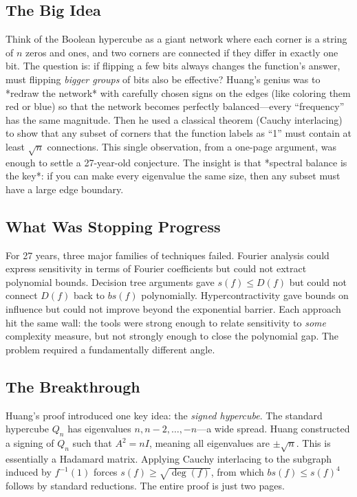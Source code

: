 \subsection{The Big Idea}
Think of the Boolean hypercube as a giant network where each corner is a string of $n$ zeros and ones, and two corners are connected if they differ in exactly one bit. The question is: if flipping a few bits always changes the function's answer, must flipping \emph{bigger groups} of bits also be effective? Huang's genius was to *redraw the network* with carefully chosen signs on the edges (like coloring them red or blue) so that the network becomes perfectly balanced---every ``frequency'' has the same magnitude. Then he used a classical theorem (Cauchy interlacing) to show that any subset of corners that the function labels as ``1'' must contain at least $\sqrt{n}$ connections. This single observation, from a one-page argument, was enough to settle a 27-year-old conjecture. The insight is that *spectral balance is the key*: if you can make every eigenvalue the same size, then any subset must have a large edge boundary.

\subsection{What Was Stopping Progress}
For 27 years, three major families of techniques failed. Fourier analysis could express sensitivity in terms of Fourier coefficients but could not extract polynomial bounds. Decision tree arguments gave $s(f) \leq D(f)$ but could not connect $D(f)$ back to $bs(f)$ polynomially. Hypercontractivity gave bounds on influence but could not improve beyond the exponential barrier. Each approach hit the same wall: the tools were strong enough to relate sensitivity to \emph{some} complexity measure, but not strongly enough to close the polynomial gap. The problem required a fundamentally different angle.

\subsection{The Breakthrough}
Huang's proof introduced one key idea: the \emph{signed hypercube}. The standard hypercube $Q_n$ has eigenvalues $n, n-2, \ldots, -n$---a wide spread. Huang constructed a signing of $Q_n$ such that $A^2 = nI$, meaning all eigenvalues are $\pm\sqrt{n}$. This is essentially a Hadamard matrix. Applying Cauchy interlacing to the subgraph induced by $f^{-1}(1)$ forces $s(f) \geq \sqrt{\deg(f)}$, from which $bs(f) \leq s(f)^4$ follows by standard reductions. The entire proof is just two pages.

